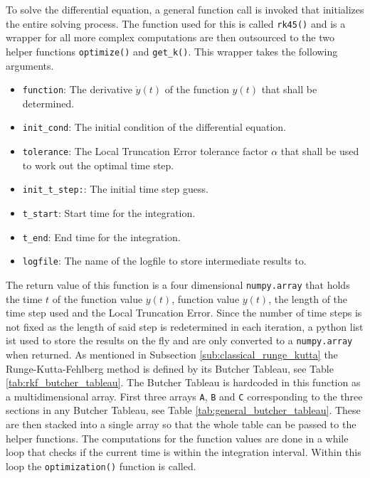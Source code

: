 \documentclass{aa}
\begin{document}
To solve the differential equation, a general function call is invoked that initializes the
entire solving process. The function used for this is called \verb+rk45()+ and is a wrapper for
all more complex computations are then outsourced to the two helper functions \verb+optimize()+
and \verb+get_k()+. This wrapper takes the following arguments.
\begin{itemize}
    \item \verb+function+: The derivative \(\dot{y}(t)\) of the function \(y(t)\) that shall be
        determined.
    \item \verb+init_cond+: The initial condition of the differential equation.
    \item \verb+tolerance+: The Local Truncation Error tolerance factor \(\alpha\) that shall
        be used to work out the optimal time step.
    \item \verb+init_t_step:+: The initial time step guess.
    \item \verb+t_start+: Start time for the integration.
    \item \verb+t_end+: End time for the integration.
    \item \verb+logfile+: The name of the logfile to store intermediate results to.
\end{itemize}
The return value of this function is a four dimensional \verb+numpy.array+ that holds the time
\(t\) of the function value \(y(t)\), function value \(y(t)\), the length of the time step used
and the Local Truncation Error. Since the number of time steps is not fixed as the length of
said step is redetermined in each iteration, a python list ist used to store the results on the
fly and are only converted to a \verb+numpy.array+ when returned. As mentioned in Subsection
\ref{sub:classical_runge_kutta} the Runge-Kutta-Fehlberg method is defined by its Butcher
Tableau, see Table \ref{tab:rkf_butcher_tableau}. The Butcher Tableau is hardcoded in this
function as a multidimensional array. First three arrays \verb+A+, \verb+B+ and \verb+C+
corresponding to the three sections in any Butcher Tableau, see Table
\ref{tab:general_butcher_tableau}. These are then stacked into a single array so that the whole
table can be passed to the helper functions. The computations for the function values are done
in a while loop that checks if the current time is within the integration interval. Within this
loop the \verb+optimization()+ function is called.
\end{document}
